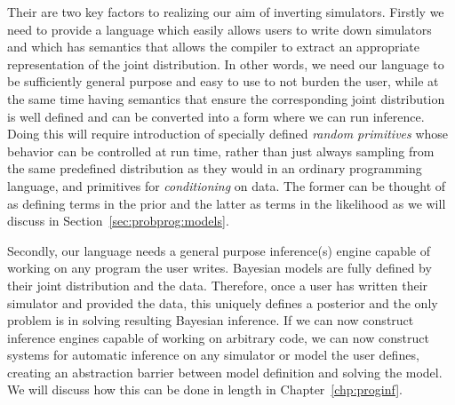 Their are two key factors to realizing our aim of inverting simulators.  Firstly we need to provide a 
language which easily allows users to
write down simulators and which has semantics that allows the compiler to extract an appropriate
representation of the joint distribution.  In other words, we need our language to be sufficiently
general purpose and easy to use to not burden the user, while at the same time having semantics that
ensure the corresponding joint distribution is well defined and can be converted into a form where
we can run inference.  Doing this will require introduction of specially defined \emph{random
	primitives} whose behavior can be controlled at run time, rather than just always sampling from
the same predefined distribution as they would in an ordinary programming language, and primitives
for \emph{conditioning} on data.  The former can be thought of as defining terms in the prior and the
latter as terms in the likelihood as we will discuss in Section~\ref{sec:probprog:models}.

Secondly, our language needs a general purpose inference(s)
engine capable of working on any program the user writes.  Bayesian models are fully defined
by their joint distribution and the data.  Therefore, once a user has written their simulator and provided
the data, this uniquely defines a posterior and the only problem is in solving resulting Bayesian inference.
If we can now construct inference engines capable of working on arbitrary code, we can now 
construct systems for automatic inference on any simulator or model the user defines, creating an
abstraction barrier between model definition and solving the model.  We will discuss how this can be
done in length in Chapter~\ref{chp:proginf}.

